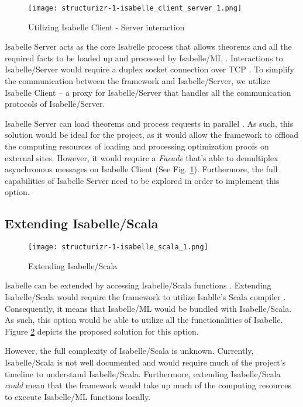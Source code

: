 \begin{figure}[h]
      \centering
      \texttt{[image: structurizr-1-isabelle\_client\_server\_1.png]}
      \caption{Utilizing Isabelle Client - Server interaction}
      \label{fig:IsabelleServer}
\end{figure}

Isabelle Server acts as the core Isabelle process that allows theorems and all the required facts to be loaded up and processed by Isabelle/ML
\cite[Ch. 4]{isabelleSystem}. Interactions to Isabelle/Server would require a duplex socket connection over TCP \cite[Ch. 4.2]{isabelleSystem}. 
To simplify the communication between the framework and Isabelle/Server, we utilize Isabelle Client \cite[Ch. 4.1.2]{isabelleSystem} -- a proxy 
for Isabelle/Server that handles all the communication protocols of Isabelle/Server.

Isabelle Server can load theorems and process requests in parallel \cite[Ch. 4.2.6]{isabelleSystem}. As such, this solution would be ideal 
for the project, as it would allow the framework to offload the computing resources of loading and processing optimization proofs on external sites.
However, it would require a \emph{Facade} that's able to demultiplex asynchronous messages on Isabelle Client (See Fig. \ref{fig:IsabelleServer}). 
Furthermore, the full capabilities of Isabelle Server need to be explored in order to implement this option.

\subsection{Extending Isabelle/Scala}
\label{sec:IsabelleScala}

\begin{figure}[h]
      \centering
      \texttt{[image: structurizr-1-isabelle\_scala\_1.png]}
      \caption{Extending Isabelle/Scala}
      \label{fig:IsabelleScala}
\end{figure}

Isabelle can be extended by accessing Isabelle/Scala functions \cite[Ch. 5]{isabelleSystem}. Extending Isabelle/Scala would require the framework 
to utilize Isablle's Scala compiler \cite[Ch. 5.1.4]{isabelleSystem}. Consequently, it means that Isabelle/ML would be bundled with Isabelle/Scala. 
As such, this option would be able to utilize all the functionalities of Isabelle. Figure \ref{fig:IsabelleScala} depicts the proposed solution for 
this option.

However, the full complexity of Isabelle/Scala is unknown. Currently, Isabelle/Scala is not well documented and would require much of the 
project's timeline to understand Isabelle/Scala. Furthermore, extending Isabelle/Scala \emph{could} mean that the framework would take up 
much of the computing resources to execute Isabelle/ML functions locally.

